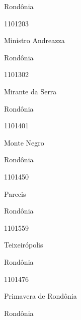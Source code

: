 \documentclass[
  letterpaper,
]{report}
\begin{document}
\n    

\n    

\n      

Rondônia

\n      

1101203

\n      

Ministro Andreazza

\n    

\n    

\n      

Rondônia

\n      

1101302

\n      

Mirante da Serra

\n    

\n    

\n      

Rondônia

\n      

1101401

\n      

Monte Negro

\n    

\n    

\n      

Rondônia

\n      

1101450

\n      

Parecis

\n    

\n    

\n      

Rondônia

\n      

1101559

\n      

Teixeirópolis

\n    

\n    

\n      

Rondônia

\n      

1101476

\n      

Primavera de Rondônia

\n    

\n    

\n      

Rondônia
\end{document}
